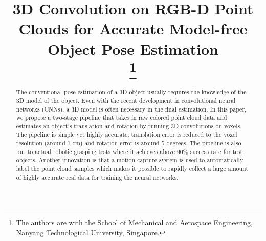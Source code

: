 \documentclass[conference]{IEEEtran}
\begin{document}
\title{3D Convolution on RGB-D Point Clouds for Accurate Model-free Object Pose Estimation \\
\thanks{The authors are with the School of Mechanical and Aerospace Engineering, Nanyang Technological University, Singapore.
}
}

\author{
\and
{}
\and
{}
}

\maketitle

\begin{abstract}
The conventional pose estimation of a 3D object usually requires the knowledge of the 3D model of the object. Even with the recent development in convolutional neural networks (CNNs), a 3D model is often necessary in the final estimation. In this paper, we propose a  two-stage pipeline that takes in raw colored point cloud data and estimates an object’s translation and rotation by running 3D convolutions on voxels. The pipeline is simple yet highly accurate: translation error is reduced to the voxel resolution (around 1 cm) and rotation error is around 5 degrees. The pipeline is also put to actual robotic grasping tests where it achieves above 90\% success rate for test objects. Another innovation is that a motion capture system is used to automatically label the point cloud samples which makes it possible to rapidly collect a large amount of highly accurate real data for training the neural networks.
\end{abstract}
\end{document}
